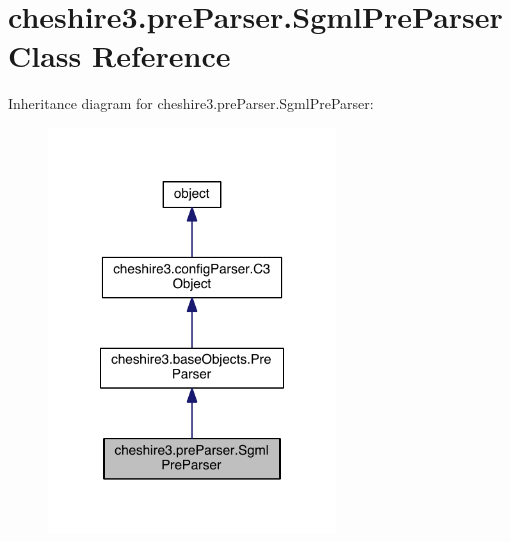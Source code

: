 \hypertarget{classcheshire3_1_1pre_parser_1_1_sgml_pre_parser}{\section{cheshire3.\-pre\-Parser.\-Sgml\-Pre\-Parser Class Reference}
\label{classcheshire3_1_1pre_parser_1_1_sgml_pre_parser}
}


Inheritance diagram for cheshire3.\-pre\-Parser.\-Sgml\-Pre\-Parser\-:
\nopagebreak
\begin{figure}[H]
\begin{center}
\leavevmode
\includegraphics[width=216pt]{classcheshire3_1_1pre_parser_1_1_sgml_pre_parser__inherit__graph}
\end{center}
\end{figure}


